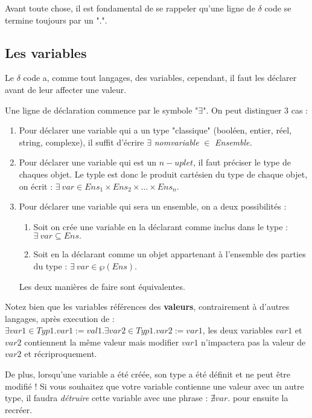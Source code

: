 \documentclass{article}
\begin{document}
Avant toute chose, il est fondamental de se rappeler qu'une ligne de $\delta$ code  se termine toujours par un ".".

\subsection{Les variables}

Le $\delta$ code a, comme tout langages, des variables, cependant, il faut les déclarer avant de leur affecter une valeur.

Une ligne de déclaration commence par le symbole "$\exists$". On peut distinguer 3 cas :

\begin{enumerate}
    \item Pour déclarer une variable qui a un type "classique" (booléen, entier, réel, string, complexe), il suffit d'écrire $\exists$ \textit{nomvariable} $\in$ \textit{Ensemble.}
    \item Pour déclarer une variable qui est un $n-uplet$, il faut préciser le type de chaques objet. Le typle est donc le produit cartésien du type de chaque objet, on écrit : $\exists~ var \in Ens_1\times Ens_2\times \dots \times Ens_n.$
    \item Pour déclarer une variable qui sera un ensemble, on a deux possibilités : 
    \begin{enumerate}
        \item Soit on crée une variable en la déclarant comme inclus dans le type : $\exists ~var \subseteq Ens.$
        \item Soit en la déclarant comme un objet appartenant à l'ensemble des parties du type : $\exists~ var  \in \wp(Ens).$
    \end{enumerate}
    Les deux manières de faire sont équivalentes.
    
\end{enumerate}

Notez bien que les variables références des \textbf{valeurs}, contrairement à d'autres langages, après execution de : $\exists var1 \in Typ1. var1 := val1. \exists var2 \in Typ1. var2 := var1$, les deux variables $var1$ et $var2$ contiennent la même valeur mais modifier $var1$ n'impactera pas la valeur de $var2$ et récriproquement. 

De plus, lorsqu'une variable a été créée, son type a été définit et ne peut être modifié ! Si vous souhaitez que votre variable contienne une valeur avec un autre type, il faudra \textit{détruire} cette variable avec une phrase : $\nexists var.$ pour ensuite la recréer. 
\end{document}
